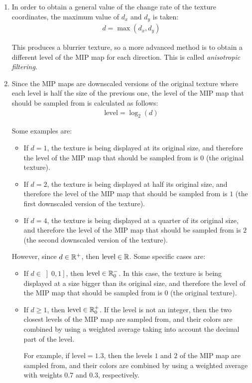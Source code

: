 \begin{enumerate}
    \item In order to obtain a general value of the change rate of the texture coordinates, the maximum value of $d_x$ and $d_y$ is taken:
    \begin{align*}
        d = \max(d_x, d_y)
    \end{align*}

    This produces a blurrier texture, so a more advanced method is to obtain a different level of the MIP map for each direction. This is called \emph{anisotropic filtering}.

    \item Since the MIP maps are downscaled versions of the original texture where each level is half the size of the previous one, the level of the MIP map that should be sampled from is calculated as follows:
    \begin{align*}
        \text{level} = \log_2(d)
    \end{align*}

    Some examples are:
    \begin{itemize}
        \item If $d=1$, the texture is being displayed at its original size, and therefore the level of the MIP map that should be sampled from is $0$ (the original texture).
        \item If $d=2$, the texture is being displayed at half its original size, and therefore the level of the MIP map that should be sampled from is $1$ (the first downscaled version of the texture).
        \item If $d=4$, the texture is being displayed at a quarter of its original size, and therefore the level of the MIP map that should be sampled from is $2$ (the second downscaled version of the texture).
    \end{itemize}

    However, since $d\in \mathbb{R}^+$, then $\text{level}\in \mathbb{R}$. Some specific cases are:
    \begin{itemize}
        \item If $d\in \left]0,1\right]$, then $\text{level}\in \mathbb{R}^-_0$. In this case, the texture is being displayed at a size bigger than its original size, and therefore the level of the MIP map that should be sampled from is $0$ (the original texture).
        \item If $d\geq 1$, then $\text{level}\in \mathbb{R}^+_0$. If the level is not an integer, then the two closest levels of the MIP map are sampled from, and their colors are combined by using a weighted average taking into account the decimal part of the level.
        
        For example, if $\text{level}=1.3$, then the levels $1$ and $2$ of the MIP map are sampled from, and their colors are combined by using a weighted average with weights $0.7$ and $0.3$, respectively.
    \end{itemize}
\end{enumerate}

